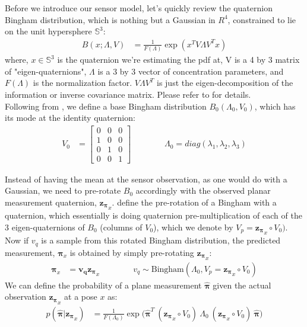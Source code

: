 \documentclass[12pt]{article}
\begin{document}
Before we introduce our sensor model, let's quickly review the quaternion Bingham distribution, which is nothing but a Gaussian in $R^4$, constrained to lie on the unit hypersphere $\mathbb{S}^3$:
\begin{align*}
	B(x;\Lambda, V) &= \frac{1}{F(\Lambda)} \exp (x^T V \Lambda V^T x)
\end{align*} 
where, $x \in \mathbb{S}^3$ is the quaternion we're estimating the pdf at, V is a 4 by 3 matrix of "eigen-quaternions", $\Lambda$ is a 3 by 3 vector of concentration parameters, and $F(\Lambda)$ is the normalization factor. 
$V \Lambda V^T$ is just the eigen-decomposition of the information or inverse covariance matrix. Please refer to \cite{glover2013tracking, glover2014quaternion} for details. \\

\noindent Following from \cite{glover2014quaternion}, we define a base Bingham distribution $B_0(\Lambda_0, V_0)$, which has its mode at the identity quaternion:
\begin{align*}
  V_0 &= \begin{bmatrix}
  0 & 0 & 0 \\ 
  1 & 0 & 0 \\ 
  0 & 1 & 0 \\ 
  0 & 0 & 1
\end{bmatrix} \qquad \qquad  \Lambda_0 = diag(\lambda_1, \lambda_2, \lambda_3)
\end{align*}

Instead of having the mean at the sensor observation, as one would do with a Gaussian, we need to pre-rotate $B_0$ accordingly with the observed planar measurement quaternion, $\boldsymbol{z_\pi}_{x}$. 
\cite{glover2014quaternion,glover2013tracking} define the pre-rotation of a Bingham with a quaternion, which essentially is doing quaternion pre-multiplication of each of the 3 eigen-quaternions of $B_0$ (columns of $V_0$), which we denote by $V_p=\boldsymbol{z_\pi}_{x} \circ V_0)$. Now if $v_q$ is a sample from this rotated Bingham distribution, the predicted measurement, $\boldsymbol{\pi}_x$ is obtained by simply pre-rotating $\boldsymbol{z_\pi}_{x}$: 
\begin{align*}
	\boldsymbol{\pi}_x &= \boldsymbol{v_q} \boldsymbol{z_\pi}_{x} \qquad  \qquad v_q  \sim \text{Bingham}(\Lambda_0, V_p=\boldsymbol{z_\pi}_{x} \circ V_0)
\end{align*}
We can define the probability of a plane measurement $\hat{\boldsymbol{\pi}}$ given the actual observation $\boldsymbol{z_\pi}_{x}$ at a pose $x$ as:
\begin{align*}
	p(\hat{\boldsymbol{\pi}} | \boldsymbol{z_\pi}_{x}) &= \frac{1}{F(\Lambda_0)} \exp \Big( \hat{\boldsymbol{\pi}}^T \ (\boldsymbol{z_\pi}_{x} \circ V_0) \ \Lambda_0 \ (\boldsymbol{z_\pi}_{x} \circ V_0) \ \hat{\boldsymbol{\pi}} \Big)
\end{align*} 
\end{document}

